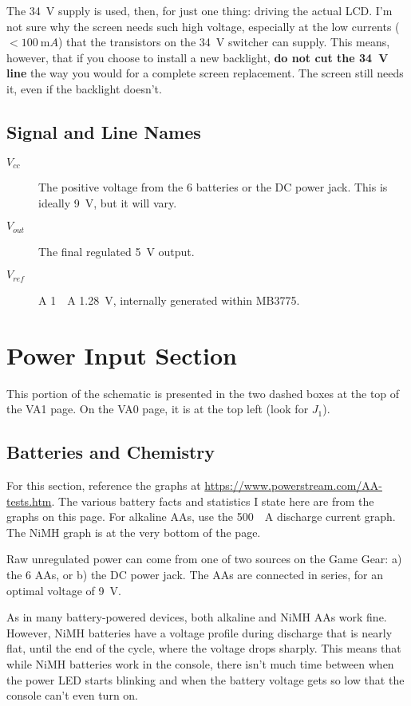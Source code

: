 \documentclass{article}
\newcommand{\Vcc}{$V_{cc}$}
\newcommand{\Vout}{$V_{out}$}
\newcommand{\Vref}{$V_{ref}$}
\newcommand{\model}{\textsf}
\begin{document}
The \qty{34}{\volt} supply is used, then, for just one thing: driving
the actual LCD. I'm not sure why the screen needs such high voltage,
especially at the low currents ($<\qty{100}{\milli{}A}$) that the
transistors on the \qty{34}{\volt} switcher can supply. This means,
however, that if you choose to install a new backlight, \textbf{do not
  cut the \qty{34}{\volt} line} the way you would for a complete
screen replacement. The screen still needs it, even if the backlight
doesn't.

\subsection{Signal and Line Names}
\begin{description}
\item[\Vcc{}] The positive voltage from the 6 batteries or the DC power
  jack. This is ideally \qty{9}{\volt}, but it will vary.
\item[\Vout{}] The final regulated \qty{5}{\volt} output.
\item[\Vref{}] A \qty{1}{\milli{}A} \qty{1.28}{\volt}, internally
  generated within \model{MB3775}.
\end{description}

\section{Power Input Section}
This portion of the schematic is presented in the two dashed boxes at
the top of the \model{VA1} page. On the \model{VA0} page, it is at the
top left (look for $J_1$).

\subsection{Batteries and Chemistry}
For this section, reference the graphs at
\url{https://www.powerstream.com/AA-tests.htm}. The various battery
facts and statistics I state here are from the graphs on this
page. For alkaline AAs, use the \qty{500}{\milli{}A} discharge current
graph. The NiMH graph is at the very bottom of the page.

Raw unregulated power can come from one of two sources on the Game
Gear: a) the 6 AAs, or b) the DC power jack. The AAs are connected
in series, for an optimal voltage of \qty{9}{\volt}.

As in many battery-powered devices, both alkaline and NiMH AAs work
fine. However, NiMH batteries have a voltage profile during discharge
that is nearly flat, until the end of the cycle, where the voltage
drops sharply. This means that while NiMH batteries work in the
console, there isn't much time between when the power LED starts
blinking and when the battery voltage gets so low that the console
can't even turn on.
\end{document}
